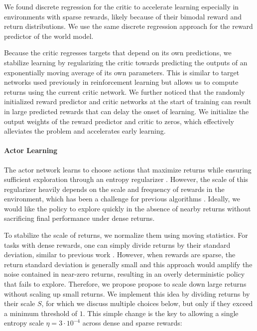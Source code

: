 
We found discrete regression for the critic to accelerate learning especially in environments with sparse rewards, likely because of their bimodal reward and return distributions.
We use the same discrete regression approach for the reward predictor of the world model.

Because the critic regresses targets that depend on its own predictions, we stabilize learning by regularizing the critic towards predicting the outputs of an exponentially moving average of its own parameters.
This is similar to target networks used previously in reinforcement learning \citep{mnih2015dqn} but allows us to compute returns using the current critic network.
We further noticed that the randomly initialized reward predictor and critic networks at the start of training can result in large predicted rewards that can delay the onset of learning.
We initialize the output weights of the reward predictor and critic to zeros, which effectively alleviates the problem and accelerates early learning.

\paragraph{Actor Learning}
The actor network learns to choose actions that maximize returns while ensuring sufficient exploration through an entropy regularizer \citep{williams1991maxentreinforce}.
However, the scale of this regularizer heavily depends on the scale and frequency of rewards in the environment, which has been a challenge for previous algorithms \citep{haarnoja2018sac}.
Ideally, we would like the policy to explore quickly in the absence of nearby returns without sacrificing final performance under dense returns.

To stabilize the scale of returns, we normalize them using moving statistics.
For tasks with dense rewards, one can simply divide returns by their standard deviation, similar to previous work \citep{schulman2017ppo}.
However, when rewards are sparse, the return standard deviation is generally small and this approach would amplify the noise contained in near-zero returns, resulting in an overly deterministic policy that fails to explore.
Therefore, we propose propose to scale down large returns without scaling up small returns.
We implement this idea by dividing returns by their scale $S$, for which we discuss multiple choices below, but only if they exceed a minimum threshold of $1$.
This simple change is the key to allowing a single entropy scale $\eta=3\cdot10^{-4}$ across dense and sparse rewards:

